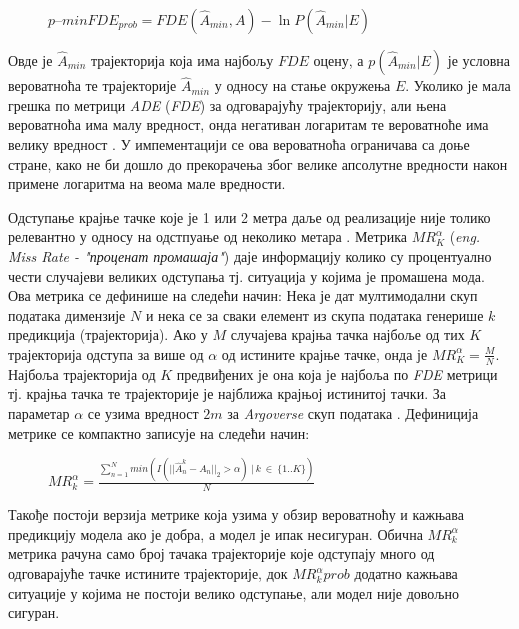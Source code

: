 \documentclass[11pt,oneside]{memoir}
\begin{document}
\begin{figure}[H]
  \centering
  $p\mbox{--}minFDE_{prob} = FDE(\hat{A}_{min}, A) - \ln{P(\hat{A}_{min}|E)}$
\end{figure}

Овде је $\hat{A}_{min}$ трајекторија која има најбољу $FDE$ оцену, а $p(\hat{A}_{min}|E)$ је условна вероватноћа те 
трајекторије $\hat{A}_{min}$ у односу на стање окружења $E$. Уколико је мала грешка по метрици \textit{ADE} (\textit{FDE}) за одговарајућу трајекторију, 
али њена вероватноћа има малу вредност, онда негативан логаритам те вероватноће има велику вредност \cite{argoverse}.
У импементацији се ова вероватноћа ограничава са доње стране, како не
би дошло до прекорачења због велике апсолутне вредности након примене логаритма на веома мале вредности.

Одступање крајње тачке које је 1 или 2 метра даље од реализације није толико релевантно у односу на одстпуање од 
неколико метара \cite{home}. Метрика $MR^{\alpha}_{K}$ (\textit{eng. Miss Rate - "проценат промашаја"}) даје информацију
колико су процентуално чести случајеви великих одступања тј. ситуација у којима је промашена мода. Ова метрика се дефинише на следећи начин: 
Нека је дат мултимодални скуп података димензије $N$ и нека се за сваки елемент из скупа података генерише $k$ предикција (трајекторија). Ако
у $M$ случајева крајња тачка најбоље од тих $K$ трајекторија одступа за више од $\alpha$ од истините крајње тачке, 
онда је $MR^{\alpha}_{K} = \frac{M}{N}$. Најбоља трајекторија од $K$ предвиђених је она која је најбоља по \textit{FDE} метрици тј.
крајња тачка те трајекторије је најближа крајњој истинитој тачки. За параметар $\alpha$ се узима вредност $2m$ за \textit{Argoverse} 
скуп података \cite{argoverse}. Дефиниција метрике се компактно записује на следећи начин:

\begin{figure}[H]
  \centering
  $MR^{\alpha}_{k} = \frac{\sum^N_{n=1} min(I(||\hat{A}^{k}_{n} - A_{n}||_{2} > \alpha)\ |\ k\ \in\ \{1..K\})}{N}$
\end{figure}

Такође постоји верзија метрике која узима у обзир вероватноћу и кажњава предикцију модела ако је добра, а модел је ипак несигуран. \cite{argoverse}
Обична $MR^{\alpha}_{k}$ метрика рачуна само број тачака трајекторије које одступају много од одговарајуће тачке истините трајекторије, док
$MR^{\alpha}_{k}{prob}$ додатно кажњава ситуације у којима не постоји велико одступање, али модел није довољно сигуран. 
\end{document}
